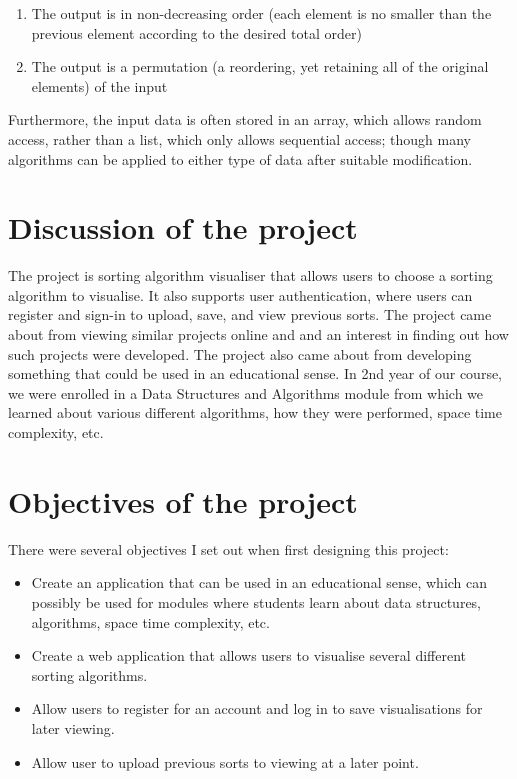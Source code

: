 \begin{enumerate}
    \item The output is in non-decreasing order (each element is no smaller than 
    the previous element according to the desired total order)
    \item The output is a permutation (a reordering, yet retaining all of the 
    original elements) of the input
\end{enumerate}

Furthermore, the input data is often stored in an array, which allows random 
access, rather than a list, which only allows sequential access; though many 
algorithms can be applied to either type of data after suitable modification.

\section{Discussion of the project}
The project is sorting algorithm visualiser that allows users to choose a sorting
algorithm to visualise. It also supports user authentication, where users can 
register and sign-in to upload, save, and view previous sorts. The project came about from viewing
similar projects online and and an interest in finding out how such projects were
developed. The project also came about from developing something that could be 
used in an educational sense. In 2nd year of our course, we were enrolled in a 
Data Structures and Algorithms module from which we learned about various 
different algorithms, how they were performed, space time complexity, etc.

\newpage
\section{Objectives of the project}
There were several objectives I set out when first designing this project:

\begin{itemize}
    \item Create an application that can be used in an educational sense, which 
    can possibly be used for modules where students learn about data structures, 
    algorithms, space time complexity, etc.
    \item Create a web application that allows users to visualise several 
    different sorting algorithms.
    \item Allow users to register for an account and log in to save
    visualisations for later viewing.
    \item Allow user to upload previous sorts to viewing at a later point.
\end{itemize}


